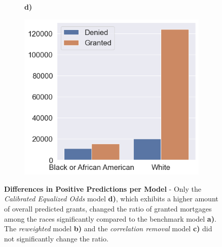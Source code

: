 \begin{figure}[!htbp]
\begin{minipage}[b]{0.5\textwidth}
\begin{subfigure}[t]{0.9\textwidth}
        \end{subfigure}
    \end{minipage}%
    \begin{minipage}[b]{0.5\textwidth}
        \centering
        \begin{subfigure}[t]{0.06\textwidth}
            \textbf{d)}
        \end{subfigure}
        \begin{subfigure}[t]{0.9\textwidth}
            \includegraphics[width=\linewidth, valign=t]{images/loan_grants_by_protected_attributes/calibrated_eqodds.png}
        \end{subfigure}
    \end{minipage}%
    \caption[Differences in Positive Predictions per Model]{\textbf{Differences in Positive Predictions per Model} - Only the \textit{Calibrated Equalized Odds} model \textbf{d)}, which exhibits a higher amount of overall predicted grants, changed the ratio of granted mortgages among the races significantly compared to the benchmark model \textbf{a)}.
    The \textit{reweighted} model \textbf{b)} and the \textit{correlation removal} model \textbf{c)} did not significantly change the ratio.}
    \label{fig:Bar_Grant_per_Race}

\end{figure}

